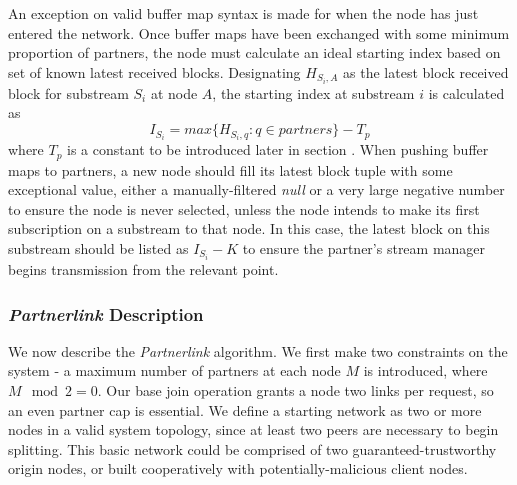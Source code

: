 \documentclass[12pt,a4paper]{article}
\begin{document}
An exception on valid buffer map syntax is made for when the node has just entered the network. Once buffer maps have been exchanged with some minimum proportion of partners, the node must calculate an ideal starting index based on set of known latest received blocks. Designating \(H_{{S_i},A}\) as the latest block received block for substream \(S_i\) at node \(A\), the starting index at substream \(i\) is calculated as \[I_{S_i} = max\{H_{{S_i},q} : q \in partners\} - T_p\] where \(T_p\) is a constant to be introduced later in section . When pushing buffer maps to partners, a new node should fill its latest block tuple with some exceptional value, either a manually-filtered \textit{null} or a very large negative number to ensure the node is never selected, unless the node intends to make its first subscription on a substream to that node. In this case, the latest block on this substream should be listed as \(I_{S_i} - K\) to ensure the partner's stream manager begins transmission from the relevant point.

\subsubsection{\textit{Partnerlink} Description}
We now describe the \textit{Partnerlink} algorithm. We first make two constraints on the system - a maximum number of partners at each node \(M\) is introduced, where \(M\mod{2} = 0\). Our base join operation grants a node two links per request, so an even partner cap is essential. We define a starting network as two or more nodes in a valid system topology, since at least two peers are necessary to begin splitting. This basic network could be comprised of two guaranteed-trustworthy origin nodes, or built cooperatively with potentially-malicious client nodes.

\end{document}
